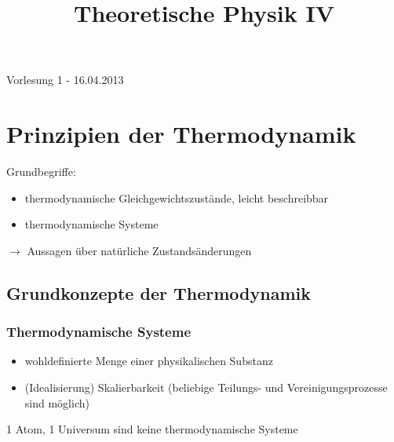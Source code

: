 \documentclass[10pt,article,colorback,accentcolor=tud9d]{scrartcl}
\title{Theoretische Physik IV}
\begin{document}
\maketitle
\tableofcontents
\newpage
\begin{flushright}Vorlesung 1 - 16.04.2013\end{flushright}
\section{Prinzipien der Thermodynamik}
Grundbegriffe:
\begin{itemize}
\item thermodynamische Gleichgewichtszustände, leicht beschreibbar
\item thermodynamische Systeme
\end{itemize}
$\rightarrow$ Aussagen über natürliche Zustandsänderungen
\subsection{Grundkonzepte der Thermodynamik}
\subsubsection{Thermodynamische Systeme}
\begin{itemize}
\item wohldefinierte Menge einer physikalischen Substanz
\item (Idealisierung) Skalierbarkeit (beliebige Teilungs- und Vereinigungsprozesse sind möglich)
\end{itemize}
1 Atom, 1 Universum sind keine thermodynamische Systeme
\end{document}
